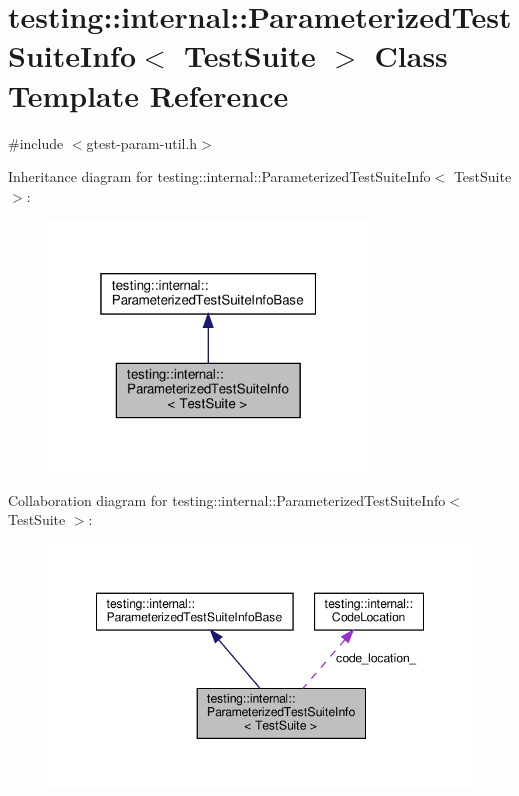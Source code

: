 \hypertarget{classtesting_1_1internal_1_1ParameterizedTestSuiteInfo}{}\section{testing\+:\+:internal\+:\+:Parameterized\+Test\+Suite\+Info$<$ Test\+Suite $>$ Class Template Reference}
\label{classtesting_1_1internal_1_1ParameterizedTestSuiteInfo}


{\ttfamily \#include $<$gtest-\/param-\/util.\+h$>$}



Inheritance diagram for testing\+:\+:internal\+:\+:Parameterized\+Test\+Suite\+Info$<$ Test\+Suite $>$\+:\nopagebreak
\begin{figure}[H]
\begin{center}
\leavevmode
\includegraphics[width=241pt]{classtesting_1_1internal_1_1ParameterizedTestSuiteInfo__inherit__graph}
\end{center}
\end{figure}


Collaboration diagram for testing\+:\+:internal\+:\+:Parameterized\+Test\+Suite\+Info$<$ Test\+Suite $>$\+:\nopagebreak
\begin{figure}[H]
\begin{center}
\leavevmode
\includegraphics[width=348pt]{classtesting_1_1internal_1_1ParameterizedTestSuiteInfo__coll__graph}
\end{center}
\end{figure}
